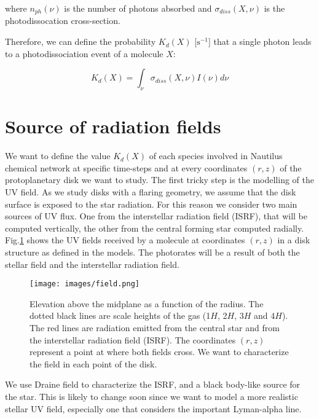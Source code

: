 \documentclass[a4paper]{article}
\begin{document}
\noindent where $n_{ph}(\nu)$ is the number of photons absorbed and $\sigma_{diss}(X, \nu)$ is the photodissocation cross-section. 

\noindent Therefore, we can define the probability $K_d(X)$ [$\mathrm{s^{-1}}$] that a single photon leads to a photodissociation event of a molecule $X$:


\begin{equation}
\label{eq:Kdef}%
	K_d(X) =  \int_\nu  \sigma_{diss}(X, \nu) I(\nu) d\nu
\end{equation}



\section{Source of radiation fields} %
\noindent We want to define the value $K_d(X)$ of each species involved in Nautilus chemical network at specific time-steps and at every coordinates $(r,z)$ of the protoplanetary disk we want to study.  
The first tricky step is the modelling of the UV field. As we study disks with a flaring geometry, we assume that the disk surface is exposed to the star radiation. For this reason we consider two main sources of UV flux. One from the interstellar radiation field (ISRF), that will be computed vertically, the other from the central forming star computed radially. Fig.\ref{fig:field} shows the UV fields received by a molecule at coordinates $(r,z)$ in a disk structure as defined in the models. The photorates will be a result of both the stellar field and the interstellar radiation field.

\begin{figure}[H]
\centering
\texttt{[image: images/field.png]}
\caption{\label{fig:field} Elevation above the midplane as a function of the radius. The dotted black lines are scale heights of the gas (1$H$, 2$H$, 3$H$ and 4$H$). The red lines are radiation emitted from the central star and from the interstellar radiation field (ISRF). The coordinates $(r,z)$ represent a point at where both fields cross. We want to characterize the field in each point of the disk. }
\end{figure}

\noindent We use Draine field to characterize the ISRF, and a black body-like source for the star. This is likely to change soon since we want to model a more realistic stellar UV field, especially one that considers the important Lyman-alpha line. 
\end{document}
